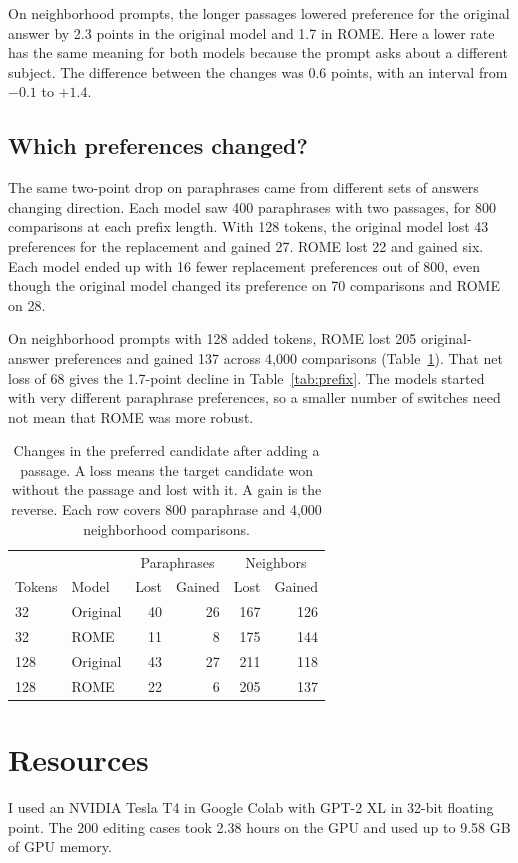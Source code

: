 \documentclass[11pt]{article}
\begin{document}
On neighborhood prompts, the longer passages lowered preference for the original answer by 2.3 points in the original model and 1.7 in ROME. Here a lower rate has the same meaning for both models because the prompt asks about a different subject. The difference between the changes was 0.6 points, with an interval from $-0.1$ to $+1.4$.

\subsection{Which preferences changed?}
The same two-point drop on paraphrases came from different sets of answers changing direction. Each model saw 400 paraphrases with two passages, for 800 comparisons at each prefix length. With 128 tokens, the original model lost 43 preferences for the replacement and gained 27. ROME lost 22 and gained six. Each model ended up with 16 fewer replacement preferences out of 800, even though the original model changed its preference on 70 comparisons and ROME on 28.

On neighborhood prompts with 128 added tokens, ROME lost 205 original-answer preferences and gained 137 across 4,000 comparisons (Table~\ref{tab:switches}). That net loss of 68 gives the 1.7-point decline in Table~\ref{tab:prefix}. The models started with very different paraphrase preferences, so a smaller number of switches need not mean that ROME was more robust.

\begin{table}[t]\centering\small
\begin{tabular}{@{}llrrrr@{}}\toprule
& & \multicolumn{2}{c}{Paraphrases} & \multicolumn{2}{c}{Neighbors}\\
Tokens & Model & Lost & Gained & Lost & Gained\\\midrule
32 & Original & 40 & 26 & 167 & 126\\
32 & ROME & 11 & 8 & 175 & 144\\
128 & Original & 43 & 27 & 211 & 118\\
128 & ROME & 22 & 6 & 205 & 137\\\bottomrule
\end{tabular}
\caption{Changes in the preferred candidate after adding a passage. A loss means the target candidate won without the passage and lost with it. A gain is the reverse. Each row covers 800 paraphrase and 4,000 neighborhood comparisons.}\label{tab:switches}
\end{table}

\FloatBarrier
\section{Resources}
I used an NVIDIA Tesla T4 in Google Colab with GPT-2 XL in 32-bit floating point. The 200 editing cases took 2.38 hours on the GPU and used up to 9.58 GB of GPU memory.
\end{document}
